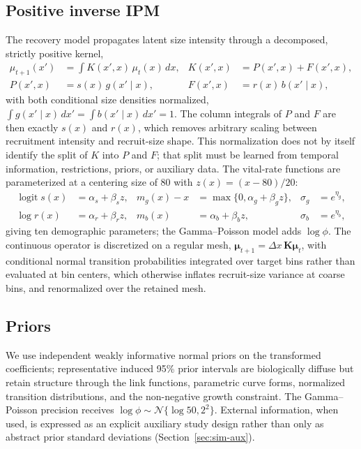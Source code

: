 \documentclass[11pt]{article}
\newcommand{\Normal}{\mathcal{N}}
\begin{document}
\subsection{Positive inverse IPM}
The recovery model propagates latent size intensity through a decomposed,
strictly positive kernel,
\begin{align}
  \mu_{t+1}(x') &= \int K(x',x)\,\mu_t(x)\,dx, &
  K(x',x) &= P(x',x)+F(x',x),\\
  P(x',x) &= s(x)\,g(x'\mid x), &
  F(x',x) &= r(x)\,b(x'\mid x),
\end{align}
with both conditional size densities normalized,
$\int g(x'\mid x)\,dx'=\int b(x'\mid x)\,dx'=1$. The column integrals of $P$ and
$F$ are then exactly $s(x)$ and $r(x)$, which removes arbitrary scaling between
recruitment intensity and recruit-size shape. This normalization does not by
itself identify the split of $K$ into $P$ and $F$; that split must be learned
from temporal information, restrictions, priors, or auxiliary data. The
vital-rate functions are parameterized at a centering size of 80 with
$z(x)=(x-80)/20$:
\begin{align}
  \operatorname{logit}s(x) &= \alpha_s+\beta_s z, &
  m_g(x)-x &= \max\{0,\alpha_g+\beta_g z\}, &
  \sigma_g &= e^{\eta_g},\\
  \log r(x) &= \alpha_r+\beta_r z, &
  m_b(x) &= \alpha_b+\beta_b z, &
  \sigma_b &= e^{\eta_b},
\end{align}
giving ten demographic parameters; the Gamma--Poisson model adds $\log\phi$. The
continuous operator is discretized on a regular mesh,
$\boldsymbol{\mu}_{t+1}=\Delta x\,\mathbf{K}\boldsymbol{\mu}_t$, with conditional
normal transition probabilities integrated over target bins rather than evaluated
at bin centers, which otherwise inflates recruit-size variance at coarse bins,
and renormalized over the retained mesh.

\subsection{Priors}
We use independent weakly informative normal priors on the transformed
coefficients; representative induced 95\% prior intervals are biologically
diffuse but retain structure through the link functions, parametric curve forms,
normalized transition distributions, and the non-negative growth constraint. The
Gamma--Poisson precision receives $\log\phi\sim\Normal\{\log 50, 2^2\}$. External
information, when used, is expressed as an explicit auxiliary study design rather
than only as abstract prior standard deviations (Section~\ref{sec:sim-aux}).
\end{document}
